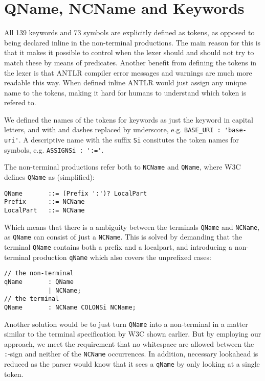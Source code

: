 \section{QName, NCName and Keywords}
\label{sect:rewritegrammar:keywordNCName}

All 139 keywords and 73 symbols are explicitly defined as tokens, as opposed to being declared inline in the non-terminal productions. The main reason for this is that it makes it possible to control when the lexer should and should not try to match these by means of predicates. Another benefit from defining the tokens in the lexer is that ANTLR compiler error messages and warnings are much more readable this way. When defined inline ANTLR would just assign any unique name to the tokens, making it hard for humans to understand which token is refered to. 

We defined the names of the tokens for keywords as just the keyword in capital letters, and with and dashes replaced by underscore, e.g. \verb!BASE_URI : 'base-uri'!. A descriptive name with the suffix \verb!Si! consitutes the token names for symbols, e.g. \verb!ASSIGNSi : ':='!.

The non-terminal productions refer both to \verb!NCName! and \verb!QName!, where W3C defines \verb!QName! as (simplified):
\begin{Verbatim}
QName       ::= (Prefix ':')? LocalPart
Prefix      ::= NCName
LocalPart   ::= NCName
\end{Verbatim}

Which means that there is a ambiguity between the terminals \verb!QName! and \verb!NCName!, as \verb!QName! can consist of just a \verb!NCName!. This is solved by demanding that the terminal \verb!QName! contains both a prefix and a localpart, and introducing a non-terminal production \verb!qName! which also covers the unprefixed cases:
\begin{Verbatim}
// the non-terminal
qName       : QName
            | NCName;
// the terminal
QName       : NCName COLONSi NCName;
\end{Verbatim}

Another solution would be to just turn \verb!QName! into a non-terminal in a matter similar to the terminal specification by W3C shown earlier. But by employing our approach, we meet the requirement that no whitespace are allowed between the \verb!:!-sign and neither of the \verb!NCName! occurrences. In addition, necessary lookahead is reduced as the parser would know that it sees a \verb!qName! by only looking at a single token.

